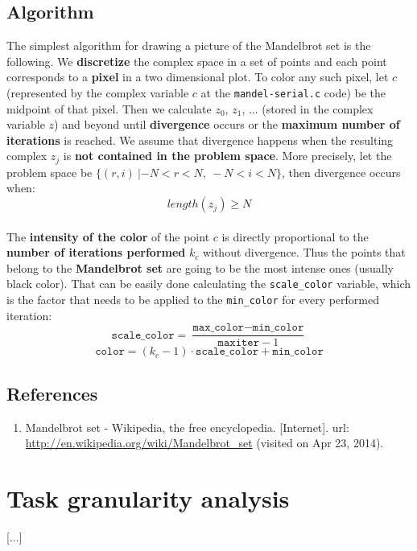\documentclass[a4paper,11pt]{article}
\begin{document}
\subsection{Algorithm}
The simplest algorithm for drawing a picture of the Mandelbrot set is the following. We \textbf{discretize} the
    complex space in a set of points and each point corresponds to a \textbf{pixel} in a two dimensional plot. To color
    any such pixel, let $c$ (represented by the complex variable $c$ at the \texttt{mandel-serial.c}
    code) be the midpoint of that pixel. Then we calculate $z_0$, $z_1$, ... (stored in the complex variable
    $z$) and beyond until \textbf{divergence} occurs or
    the \textbf{maximum number of iterations} is reached. We assume that divergence happens when the resulting complex
    $z_j$ is \textbf{not contained in the problem space}. More precisely, let the problem space be
    $\{ (r, i) \: | -\!N < r < N, \: -N < i < N \}$, then divergence occurs when:
\[
length(z_j) \geq N
\]
\\
The \textbf{intensity of the color} of the point $c$ is directly proportional to the \textbf{number of iterations performed}
    $k_c$ without divergence. Thus the points that belong to the \textbf{Mandelbrot set} are going to be the most intense ones
    (usually black color). That can be easily done calculating the \texttt{scale\_color} variable, which is the factor that needs
    to be applied to the \texttt{min\_color} for every performed iteration:
\[
\texttt{scale\_color}
=
\frac{\texttt{max\_color} - \texttt{min\_color}}{\texttt{maxiter} - 1}
\]
\[
\texttt{color}
=
(k_c - 1) \cdot \texttt{scale\_color} + \texttt{min\_color}
\]
\subsection{References}
\label{mandelbrot:references}
\begin{enumerate}
\item{Mandelbrot set - Wikipedia, the free encyclopedia. [Internet]. url:
    \url{http://en.wikipedia.org/wiki/Mandelbrot\_set} (visited on Apr 23, 2014).}
\end{enumerate}
\clearpage
\section{Task granularity analysis}
[...]
\clearpage
\end{document}
